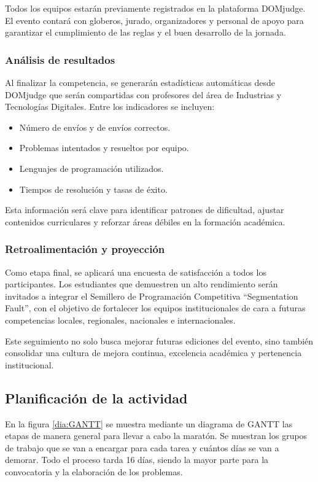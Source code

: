 \documentclass{article}
\begin{document}
Todos los equipos estarán previamente registrados en la plataforma DOMjudge. El evento contará con globeros, jurado, organizadores y personal de apoyo para garantizar el cumplimiento de las reglas y el buen desarrollo de la jornada.

\subsubsection{Análisis de resultados}


Al finalizar la competencia, se generarán estadísticas automáticas desde DOMjudge que serán compartidas con profesores del área de Industrias y Tecnologías Digitales. Entre los indicadores se incluyen:

\begin{itemize}
  \item Número de envíos y de envíos correctos.
  \item Problemas intentados y resueltos por equipo.
  \item Lenguajes de programación utilizados.
  \item Tiempos de resolución y tasas de éxito.
\end{itemize}

Esta información será clave para identificar patrones de dificultad, ajustar contenidos curriculares y reforzar áreas débiles en la formación académica.

\subsubsection{Retroalimentación y proyección}

Como etapa final, se aplicará una encuesta de satisfacción a todos los participantes. Los estudiantes que demuestren un alto rendimiento serán invitados a integrar el Semillero de Programación Competitiva “Segmentation Fault”, con el objetivo de fortalecer los equipos institucionales de cara a futuras competencias locales, regionales, nacionales e internacionales.

Este seguimiento no solo busca mejorar futuras ediciones del evento, sino también consolidar una cultura de mejora continua, excelencia académica y pertenencia institucional.


\subsection{Planificación de la actividad}


En la figura \ref{dia:GANTT} se muestra mediante un diagrama de GANTT las etapas de manera general para llevar a cabo la maratón. Se muestran los grupos de trabajo que se van a encargar para cada tarea y cuántos días se van a demorar. Todo el proceso tarda 16 días, siendo la mayor parte para la convocatoria y la elaboración de los problemas.
\end{document}
